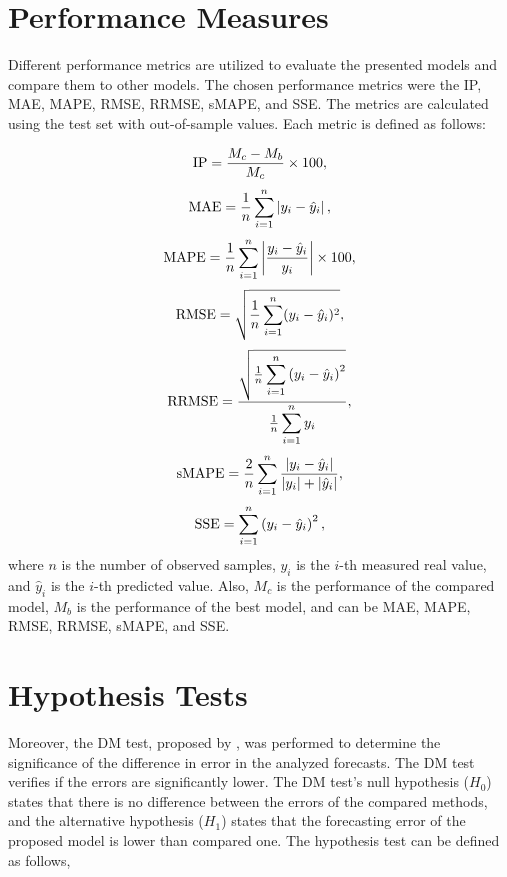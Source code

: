 \section{Performance Measures}
Different performance metrics are utilized to evaluate the presented models and compare them to other models. The chosen performance metrics were the \ac{IP}, \ac{MAE}, \ac{MAPE}, \ac{RMSE}, \ac{RRMSE}, \ac{sMAPE}, and \ac{SSE}. The metrics are calculated using the test set with out-of-sample values. Each metric is defined as follows:

\begin{equation}
    \textnormal{IP} = \frac{M_c - M_b}{M_c} \times 100,
    \label{eq:ip}
\end{equation}
\begin{equation}
    \textnormal{MAE} = \frac{1}{n} \displaystyle \sum_{i=1}^{n} \left|y_{i}-\hat{y}_{i}\right|,
    \label{eq:mae}
\end{equation}
\begin{equation}
	\textnormal{MAPE} = \frac{1}{n}\displaystyle \sum_{i=1}^{n}\left|\frac{y_{i}-\hat{y}_{i}}{y_{i}}\right|\times 100,
	\label{eq:mape}
\end{equation}
\begin{equation}
	\textnormal{RMSE} = \displaystyle \sqrt{\frac{1}{n}\sum_{i=1}^{n} (y_i-\hat{y}_i)^2},
	\label{eq:rmse}
\end{equation}
\begin{equation}
	\textnormal{RRMSE} = \frac{\sqrt{\frac{1}{n} \displaystyle \sum_{i=1}^{n} \left(y_i-\hat{y}_i\right)^2}}{\frac{1}{n} \displaystyle \sum_{i=1}^{n} y_i},
	\label{eq:rrmse}
\end{equation}
\begin{equation}
    \textnormal{sMAPE} = \frac{2}{n} \displaystyle \sum_{i=1}^{n} \frac{\left|y_i - \hat{y}_i\right|}{\left|y_i\right|+\left|\hat{y}_i\right|},
    \label{eq:smape}
\end{equation}
\begin{equation}
    \textnormal{SSE} = \displaystyle \sum_{i=1}^{n} \left(y_i - \hat{y}_i\right)^2,
    \label{eq:sse}
\end{equation}
where $n$ is the number of observed samples, $y_i$ is the $i$-th measured real value, and $\hat{y}_{i}$ is the $i$-th predicted value. Also, $M_c$ is the performance of the compared model, $M_b$ is the performance of the best model, and can be \ac{MAE}, \ac{MAPE}, \ac{RMSE}, \ac{RRMSE}, \ac{sMAPE}, and \ac{SSE}.

\section{Hypothesis Tests}
Moreover, the \ac{DM} test, proposed by , was performed to determine the significance of the difference in error in the analyzed forecasts. The \ac{DM} test verifies if the errors are significantly lower. The \ac{DM} test's null hypothesis ($H_0$) states that there is no difference between the errors of the compared methods, and the alternative hypothesis ($H_1$) states that the forecasting error of the proposed model is lower than compared one. The hypothesis test can be defined as follows,

